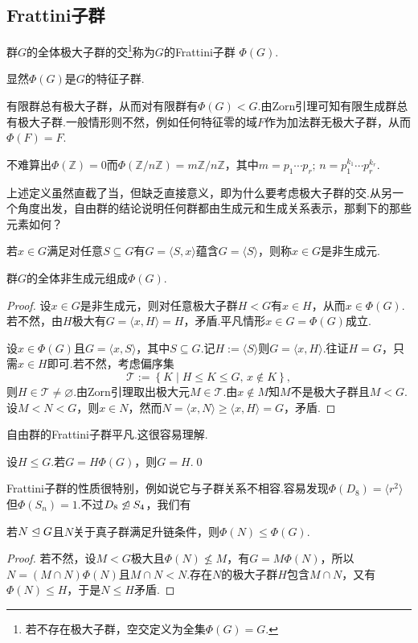 \subsection{Frattini子群}
\begin{definition}
	群$G$的全体极大子群的交\footnote{若不存在极大子群，空交定义为全集$\Phi(G)=G$.}称为$G$的{\heiti Frattini子群} $\Phi(G)$.
\end{definition}

显然$\Phi(G)$是$G$的特征子群.

有限群总有极大子群，从而对有限群有$\Phi(G)<G$.由Zorn引理可知有限生成群总有极大子群.一般情形则不然，例如任何特征零的域$F$作为加法群无极大子群，从而$\Phi(F)=F$.

不难算出$\Phi(\mathbb{Z})=0$而$\Phi(\mathbb{Z}/n\mathbb{Z})=m\mathbb{Z}/n\mathbb{Z}$，其中$m=p_1\cdots p_r;\,n=p_1^{k_1}\cdots p_r^{k_r}$.

\medskip 上述定义虽然直截了当，但缺乏直接意义，即为什么要考虑极大子群的交.从另一个角度出发，自由群的结论说明任何群都由生成元和生成关系表示，那剩下的那些元素如何？

若$x\in G$满足对任意$S\subseteq G$有$G=\langle S,x\rangle $蕴含$G=\langle S\rangle $，则称$x\in G$是{\heiti 非生成元}.

\begin{thm}
	群$G$的全体非生成元组成$\Phi(G)$.
\end{thm}
\begin{proof}
	设$x\in G$是非生成元，则对任意极大子群$H<G$有$x\in H$，从而$x\in\Phi(G)$.若不然，由$H$极大有$G=\langle x,H\rangle=H$，矛盾.平凡情形$x\in G=\Phi(G)$成立.

	设$x\in\Phi(G)$且$G=\langle x,S\rangle $，其中$S\subseteq G$.记$H:=\langle S\rangle $则$G=\langle x,H\rangle $.往证$H=G$，只需$x\in H$即可.若不然，考虑偏序集
	\[
		\mathcal{T}:=\left\{K\mid H\le K\le G,\,x\notin K\right\},
	\]
	则$H\in\mathcal{T}\ne\varnothing$.由Zorn引理取出极大元$M\in\mathcal{T}$.由$x\notin M$知$M$不是极大子群且$M<G$.设$M<N<G$，则$x\in N$，然而$N=\langle x,N\rangle\ge\langle x,H\rangle=G$，矛盾.
\end{proof}
\begin{remark}
	自由群的Frattini子群平凡.这很容易理解.
\end{remark}
\begin{cor*}
	设$H\le G$.若$G=H\Phi(G)$，则$G=H$.\qed
\end{cor*}

Frattini子群的性质很特别，例如说它与子群关系不相容.容易发现$\Phi(D_8)=\langle r^2\rangle $但$\Phi(S_n)=1$.不过$D_8\not\trianglelefteq S_4$，我们有
\begin{prop}
	若$N\trianglelefteq G$且$N$关于真子群满足升链条件，则$\Phi(N)\le\Phi(G)$.
\end{prop}
\begin{proof}
	若不然，设$M<G$极大且$\Phi(N)\nleq M$，有$G=M\Phi(N)$，所以$N=(M\cap N)\Phi(N)$且$M\cap N<N$.存在$N$的极大子群$H$包含$M\cap N$，又有$\Phi(N)\le H$，于是$N\le H$矛盾.
\end{proof}


